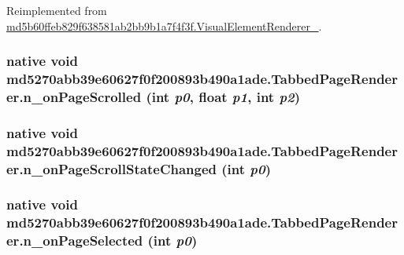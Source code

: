 Reimplemented from \hyperlink{classmd5b60ffeb829f638581ab2bb9b1a7f4f3f_1_1_visual_element_renderer__1_93658aeaafe1fbcb5301e4b9cbf9f833}{md5b60ffeb829f638581ab2bb9b1a7f4f3f.VisualElementRenderer\_}.\hypertarget{classmd5270abb39e60627f0f200893b490a1ade_1_1_tabbed_page_renderer_161ccbbec617373684ccbe9b5c3cfa50}{
\subsubsection[{n\_\-onPageScrolled}]{\setlength{\rightskip}{0pt plus 5cm}native void md5270abb39e60627f0f200893b490a1ade.TabbedPageRenderer.n\_\-onPageScrolled (int {\em p0}, \/  float {\em p1}, \/  int {\em p2})}}
\label{classmd5270abb39e60627f0f200893b490a1ade_1_1_tabbed_page_renderer_161ccbbec617373684ccbe9b5c3cfa50}


\hypertarget{classmd5270abb39e60627f0f200893b490a1ade_1_1_tabbed_page_renderer_a4d8436848d7db0020636b0af3052198}{
\subsubsection[{n\_\-onPageScrollStateChanged}]{\setlength{\rightskip}{0pt plus 5cm}native void md5270abb39e60627f0f200893b490a1ade.TabbedPageRenderer.n\_\-onPageScrollStateChanged (int {\em p0})}}
\label{classmd5270abb39e60627f0f200893b490a1ade_1_1_tabbed_page_renderer_a4d8436848d7db0020636b0af3052198}


\hypertarget{classmd5270abb39e60627f0f200893b490a1ade_1_1_tabbed_page_renderer_02722c0ec664951d4510f9693e12ce38}{
\subsubsection[{n\_\-onPageSelected}]{\setlength{\rightskip}{0pt plus 5cm}native void md5270abb39e60627f0f200893b490a1ade.TabbedPageRenderer.n\_\-onPageSelected (int {\em p0})}}
\label{classmd5270abb39e60627f0f200893b490a1ade_1_1_tabbed_page_renderer_02722c0ec664951d4510f9693e12ce38}


